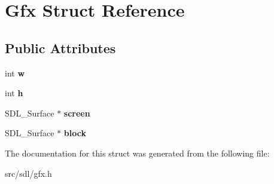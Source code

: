 \hypertarget{structGfx}{}\section{Gfx Struct Reference}
\label{structGfx}
\subsection*{Public Attributes}
\begin{DoxyCompactItemize}
\item 
\mbox{\label{structGfx_a2ea97bcb00b5a39e57b64250744121ca}} 
int {\bfseries w}
\item 
\mbox{\label{structGfx_a1eab5fc6662cecae7b2caf80525ec70a}} 
int {\bfseries h}
\item 
\mbox{\label{structGfx_a9eea9af05219cdf8d49bad3f1eb1dc7d}} 
S\+D\+L\+\_\+\+Surface $\ast$ {\bfseries screen}
\item 
\mbox{\label{structGfx_a0de5916264806daf13a550936bd3073f}} 
S\+D\+L\+\_\+\+Surface $\ast$ {\bfseries block}
\end{DoxyCompactItemize}


The documentation for this struct was generated from the following file\+:\begin{DoxyCompactItemize}
\item 
src/sdl/gfx.\+h\end{DoxyCompactItemize}
